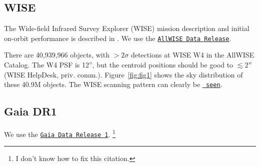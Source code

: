 \documentclass[11pt,a4paper]{article}
\begin{document}
    \subsection{WISE}
    The Wide-field Infrared Survey Explorer (WISE) mission description and
    initial on-orbit performance is described in \citet[][]{Wright10}.
    We use the \href{http://wise2.ipac.caltech.edu/docs/release/allwise/expsup/}
    {\tt AllWISE Data Release}. 

    There are 40,939,966 objects, with $>2\sigma$ detections at WISE
    W4 in the AllWISE Catalog. The W4 PSF is 12'', but the centroid
    positions should be good to $\lesssim2''$ (WISE HelpDesk,
    priv. comm.).  Figure~\ref{fig:fig1} shows the sky distribution of
    these 40.9M objects.  The WISE scanning pattern can clearly be 
    \href{http://wise2.ipac.caltech.edu/docs/release/allwise/expsup/sec4_2.html}{{\tt
      seen}}.

    \subsection{Gaia DR1} 
    We use the \href{https://www.cosmos.esa.int/web/gaia/dr1}{{\tt Gaia Data Release 1}}.
    \citep{Gaia16a, Gaia16b}\footnote{I don't know how to fix this citation.}
\end{document}
